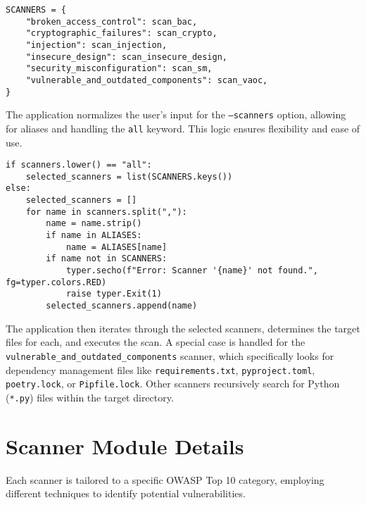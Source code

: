 \begin{verbatim}
SCANNERS = {
    "broken_access_control": scan_bac,
    "cryptographic_failures": scan_crypto,
    "injection": scan_injection,
    "insecure_design": scan_insecure_design,
    "security_misconfiguration": scan_sm,
    "vulnerable_and_outdated_components": scan_vaoc,
}
\end{verbatim}

The application normalizes the user's input for the \texttt{--scanners} option, allowing for aliases and handling the \texttt{all} keyword. This logic ensures flexibility and ease of use.

\begin{verbatim}
if scanners.lower() == "all":
    selected_scanners = list(SCANNERS.keys())
else:
    selected_scanners = []
    for name in scanners.split(","):
        name = name.strip()
        if name in ALIASES:
            name = ALIASES[name]
        if name not in SCANNERS:
            typer.secho(f"Error: Scanner '{name}' not found.", fg=typer.colors.RED)
            raise typer.Exit(1)
        selected_scanners.append(name)
\end{verbatim}

The application then iterates through the selected scanners, determines the target files for each, and executes the scan. A special case is handled for the \texttt{vulnerable\_and\_outdated\_components} scanner, which specifically looks for dependency management files like \texttt{requirements.txt}, \texttt{pyproject.toml}, \texttt{poetry.lock}, or \texttt{Pipfile.lock}. Other scanners recursively search for Python (\texttt{*.py}) files within the target directory.

\section{Scanner Module Details}
\label{sec:scanner_modules}

Each scanner is tailored to a specific OWASP Top 10 category, employing different techniques to identify potential vulnerabilities. 


